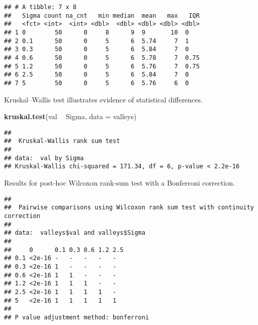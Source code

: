 \documentclass[]{book}
\newenvironment{Shaded}{\begin{snugshade}}{\end{snugshade}}
\newcommand{\DataTypeTok}[1]{\textcolor[rgb]{0.13,0.29,0.53}{#1}}
\newcommand{\KeywordTok}[1]{\textcolor[rgb]{0.13,0.29,0.53}{\textbf{#1}}}
\newcommand{\NormalTok}[1]{#1}
\newcommand{\OperatorTok}[1]{\textcolor[rgb]{0.81,0.36,0.00}{\textbf{#1}}}
\newcommand{\OtherTok}[1]{\textcolor[rgb]{0.56,0.35,0.01}{#1}}
\newcommand{\StringTok}[1]{\textcolor[rgb]{0.31,0.60,0.02}{#1}}
\begin{document}
\begin{verbatim}
## # A tibble: 7 x 8
##   Sigma count na_cnt   min median  mean   max   IQR
##   <fct> <int>  <int> <dbl>  <dbl> <dbl> <dbl> <dbl>
## 1 0        50      0     8      9  9       10  0   
## 2 0.1      50      0     5      6  5.74     7  1   
## 3 0.3      50      0     5      6  5.84     7  0   
## 4 0.6      50      0     5      6  5.78     7  0.75
## 5 1.2      50      0     5      6  5.76     7  0.75
## 6 2.5      50      0     5      6  5.84     7  0   
## 7 5        50      0     5      6  5.76     6  0
\end{verbatim}

Kruskal--Wallis test illustrates evidence of statistical differences.

\begin{Shaded}
\begin{Highlighting}[]
\KeywordTok{kruskal.test}\NormalTok{(val }\OperatorTok{~}\StringTok{ }\NormalTok{Sigma, }\DataTypeTok{data =}\NormalTok{ valleys)}
\end{Highlighting}
\end{Shaded}

\begin{verbatim}
## 
##  Kruskal-Wallis rank sum test
## 
## data:  val by Sigma
## Kruskal-Wallis chi-squared = 171.34, df = 6, p-value < 2.2e-16
\end{verbatim}

Results for post-hoc Wilcoxon rank-sum test with a Bonferroni correction.

\begin{Shaded}
\end{Shaded}

\begin{verbatim}
## 
##  Pairwise comparisons using Wilcoxon rank sum test with continuity correction 
## 
## data:  valleys$val and valleys$Sigma 
## 
##     0      0.1 0.3 0.6 1.2 2.5
## 0.1 <2e-16 -   -   -   -   -  
## 0.3 <2e-16 1   -   -   -   -  
## 0.6 <2e-16 1   1   -   -   -  
## 1.2 <2e-16 1   1   1   -   -  
## 2.5 <2e-16 1   1   1   1   -  
## 5   <2e-16 1   1   1   1   1  
## 
## P value adjustment method: bonferroni
\end{verbatim}
\end{document}
